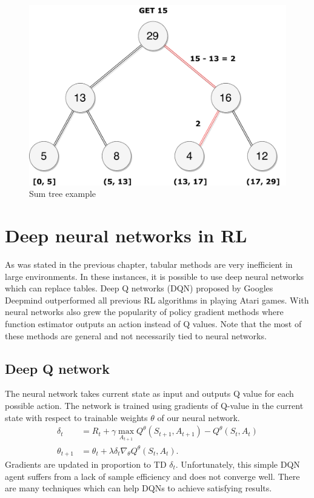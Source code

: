 \begin{figure}[H]
\centering
\includegraphics[scale=0.55]{fig/sumtree.pdf}
\caption{Sum tree example}
\label{fig:sumtree}
\end{figure}
\clearpage
\section{Deep neural networks in RL}
As was stated in the previous chapter, tabular methods are very inefficient in large environments. In these instances, it is possible to use deep neural networks which can replace tables. Deep Q networks (DQN) proposed by Googles Deepmind \cite{mnih2015} outperformed all previous RL algorithms in playing Atari games. With neural networks also grew the popularity of policy gradient methods where function estimator outputs an action instead of Q values. Note that the most of these methods are general and not necessarily tied to neural networks.

\subsection{Deep Q network}
The neural network takes current state as input and outputs Q value for each possible action. The network is trained using gradients of Q-value in the current state with respect to trainable weights $\theta$ of our neural network.
\begin{align} \label{eq:qlearn}
\delta_t &= R_{t} + \gamma \underset{A_{t+1}}{\max}Q^\theta(S_{t+1}, A_{t+1}) - Q^\theta(S_t, A_t)\\
\theta_{t+1} &= \theta_t + \lambda \delta_t \nabla_\theta Q^\theta (S_t, A_t).
\end{align}
Gradients are updated in proportion to TD $\delta_t$. Unfortunately, this simple DQN agent suffers from a lack of sample efficiency and does not converge well. There are many techniques which can help DQNs to achieve satisfying results.

